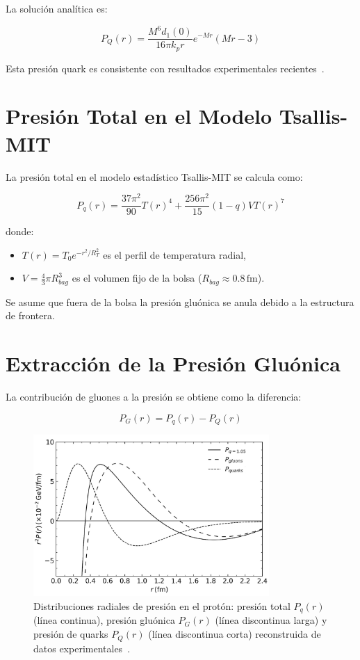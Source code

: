La soluci\'on anal\'itica es:

\begin{equation}
P_Q(r) = \frac{M^6 d_1(0)}{16\pi k_p r} e^{-M r}(M r - 3)
\end{equation}

Esta presi\'on quark es consistente con resultados experimentales recientes~\cite{Burkert_2018}.

\section{Presi\'on Total en el Modelo Tsallis-MIT}
La presi\'on total en el modelo estad\'istico Tsallis-MIT se calcula como:

\begin{equation}
P_q(r) = \frac{37\pi^2}{90} T(r)^4 + \frac{256\pi^2}{15}(1-q) V T(r)^7
\end{equation}

donde:
\begin{itemize}
\item $T(r) = T_0 e^{-r^2/R_T^2}$ es el perfil de temperatura radial,
\item $V = \frac{4}{3}\pi R_{bag}^3$ es el volumen fijo de la bolsa (\( R_{bag} \approx 0.8\,\mathrm{fm} \)).
\end{itemize}

Se asume que fuera de la bolsa la presi\'on glu\'onica se anula debido a la estructura de frontera.

\section{Extracci\'on de la Presi\'on Glu\'onica}
La contribuci\'on de gluones a la presi\'on se obtiene como la diferencia:

\begin{equation}
P_G(r) = P_q(r) - P_Q(r)
\end{equation}

\begin{figure}[h]
    \centering
    \includegraphics[width=0.8\textwidth]{./Images/PressureDistributionsTot-Q-G.png}
    \caption[Distribuciones radiales de presi\'on en el prot\'on]{Distribuciones radiales de presi\'on en el prot\'on: presi\'on total $P_q(r)$ (l\'inea continua), presi\'on glu\'onica $P_G(r)$ (l\'inea discontinua larga) y presi\'on de quarks $P_Q(r)$ (l\'inea discontinua corta) reconstruida de datos experimentales~\cite{Burkert_2018}.}
    \label{fig:PressureDecomp}
\end{figure}

